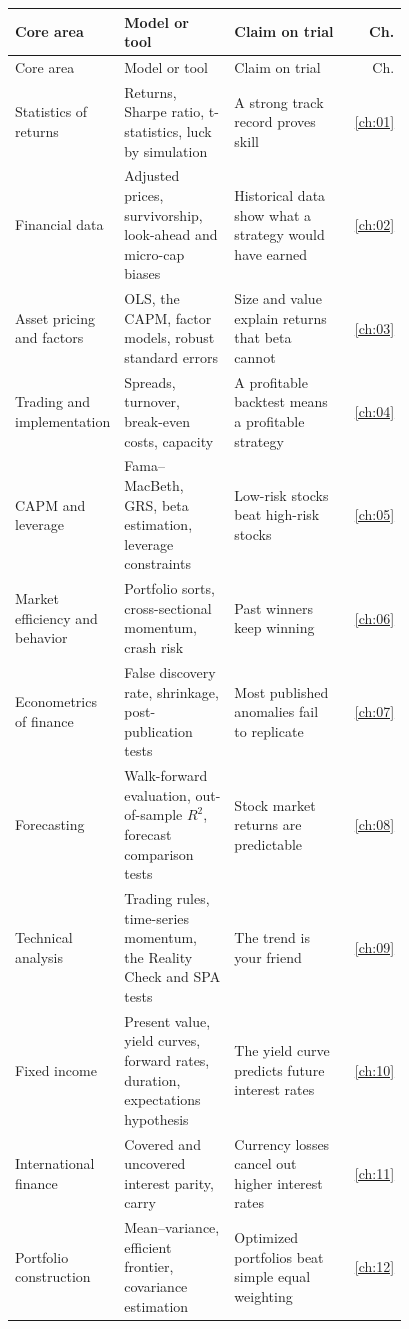 \begingroup
\small
\setlength{\LTpre}{6pt}\setlength{\LTpost}{6pt}
\begin{longtable}{@{}>{\raggedright\arraybackslash}p{0.198\linewidth}>{\raggedright\arraybackslash}p{0.288\linewidth}>{\raggedright\arraybackslash}p{0.297\linewidth}r@{}}
\toprule
Core area & Model or tool & Claim on trial & Ch. \\
\midrule
\endfirsthead
\toprule
Core area & Model or tool & Claim on trial & Ch. \\
\midrule
\endhead
\bottomrule
\endlastfoot
Statistics of returns & Returns, Sharpe ratio, t-statistics, luck by simulation & A strong track record proves skill & \ref{ch:01} \\
Financial data & Adjusted prices, survivorship, look-ahead and micro-cap biases & Historical data show what a strategy would have earned & \ref{ch:02} \\
Asset pricing and factors & OLS, the CAPM, factor models, robust standard errors & Size and value explain returns that beta cannot & \ref{ch:03} \\
Trading and implementation & Spreads, turnover, break-even costs, capacity & A profitable backtest means a profitable strategy & \ref{ch:04} \\
CAPM and leverage & Fama--MacBeth, GRS, beta estimation, leverage constraints & Low-risk stocks beat high-risk stocks & \ref{ch:05} \\
Market efficiency and behavior & Portfolio sorts, cross-sectional momentum, crash risk & Past winners keep winning & \ref{ch:06} \\
Econometrics of finance & False discovery rate, shrinkage, post-publication tests & Most published anomalies fail to replicate & \ref{ch:07} \\
Forecasting & Walk-forward evaluation, out-of-sample $R^2$, forecast comparison tests & Stock market returns are predictable & \ref{ch:08} \\
Technical analysis & Trading rules, time-series momentum, the Reality Check and SPA tests & The trend is your friend & \ref{ch:09} \\
Fixed income & Present value, yield curves, forward rates, duration, expectations hypothesis & The yield curve predicts future interest rates & \ref{ch:10} \\
International finance & Covered and uncovered interest parity, carry & Currency losses cancel out higher interest rates & \ref{ch:11} \\
Portfolio construction & Mean--variance, efficient frontier, covariance estimation & Optimized portfolios beat simple equal weighting & \ref{ch:12} \\

\end{longtable}
